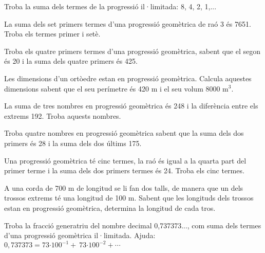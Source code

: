 \begin{activitats}
\begin{mylist}
\exer  Troba la suma dels termes de la progressió il·limitada: 8, 4, 2, 1,... 

\begin{comment}
\exer  Troba tres nombres en progressió geomètrica sabent que la seva suma és 26 i el seu producte 216. 
\end{comment}

\exer  La suma dels set primers termes d'una progressió geomètrica de raó 3 és 7651. Troba els termes primer i setè. 

\exer \hot  Troba els quatre primers termes d'una progressió geomètrica, sabent que el segon és 20 i la suma dels quatre primers és 425. 

\exer  Les dimensions d'un ortòedre estan en progressió geomètrica. Calcula aquestes dimensions sabent que el seu perímetre és 420 m i el seu volum 8000 m${}^{3}$.
\begin{comment}
\exer  Divideix el número 221 en tres parts enteres que formen una progressió geomètrica tal que el tercer terme sobrepassa al primer en 136. 
\end{comment}

\exer  La suma de tres nombres en progressió geomètrica és 248 i la diferència entre els extrems 192. Troba aquests nombres. 

\exer  Troba quatre nombres en progressió geomètrica sabent que la suma dels dos primers és 28 i la suma dels dos últims 175. 
 
\exer  Una progressió geomètrica té cinc termes, la raó és igual a la quarta part del primer terme i la suma dels dos primers termes és 24. Troba els cinc termes. 

\exer  A una corda de 700 m de longitud se li fan dos talls, de manera que un dels trossos extrems té una longitud de 100 m. Sabent que les longituds dels trossos estan en progressió geomètrica, determina la longitud de cada tros. 

\exer  Troba la fracció generatriu del nombre decimal 0,737373..., com suma dels termes d'una progressió geomètrica il·limitada.  Ajuda:  $0,737373=73\textrm{·}{100}^{-1}+\ 73\textrm{·}{100}^{-2}+\cdots$


\end{mylist}
\end{activitats}
